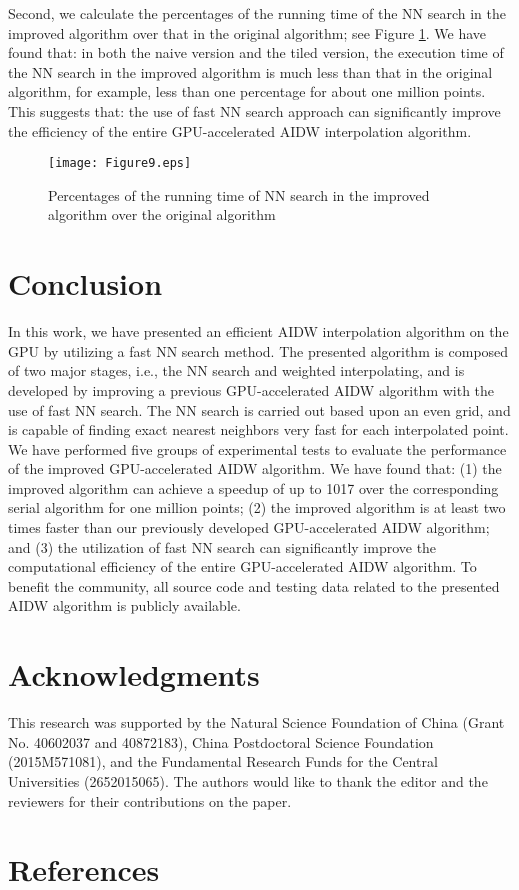 \documentclass[final,5p,times,twocolumn,authoryear]{elsarticle}
\begin{document}
			Second, we calculate the percentages of the running time of the NN search in 
			the improved algorithm over that in the original algorithm; see Figure \ref{fig9}. We 
			have found that: in both the naive version and the tiled version, the 
			execution time of the NN search in the improved algorithm is much less than 
			that in the original algorithm, for example, less than one percentage for 
			about one million points. This suggests that: the use of fast NN search 
			approach can significantly improve the efficiency of the entire 
			GPU-accelerated AIDW interpolation algorithm. 

\begin{figure}[!h]
				\centering
				\texttt{[image: Figure9.eps]}
				\caption{Percentages of the running time of NN search in the 
					improved algorithm over the original algorithm}
				\label{fig9}
			\end{figure}
						
			\section{Conclusion}
			In this work, we have presented an efficient AIDW interpolation algorithm on 
			the GPU by utilizing a fast NN search method. The presented algorithm is 
			composed of two major stages, i.e., the NN search and weighted 
			interpolating, and is developed by improving a previous GPU-accelerated AIDW 
			algorithm with the use of fast NN search. The NN search is carried out based 
			upon an even grid, and is capable of finding exact nearest neighbors very 
			fast for each interpolated point. We have performed five groups of 
			experimental tests to evaluate the performance of the improved 
			GPU-accelerated AIDW algorithm. We have found that: (1) the improved 
			algorithm can achieve a speedup of up to 1017 over the corresponding serial 
			algorithm for one million points; (2) the improved algorithm is at least two times faster than our 
			previously developed GPU-accelerated AIDW algorithm; and (3) the utilization 
			of fast NN search can significantly improve the computational efficiency of 
			the entire GPU-accelerated AIDW algorithm. To benefit the community, all 
			source code and testing data related to the presented AIDW algorithm is 
			publicly available.

			\section*{Acknowledgments}
			This research was supported by the Natural Science Foundation of China 
			(Grant No. 40602037 and 40872183), China Postdoctoral Science Foundation 
			(2015M571081), and the Fundamental Research Funds for the Central 
			Universities (2652015065). The authors would like to thank the editor and 
			the reviewers for their contributions on the paper. 

\section*{References}
			
   
  
\end{document}
